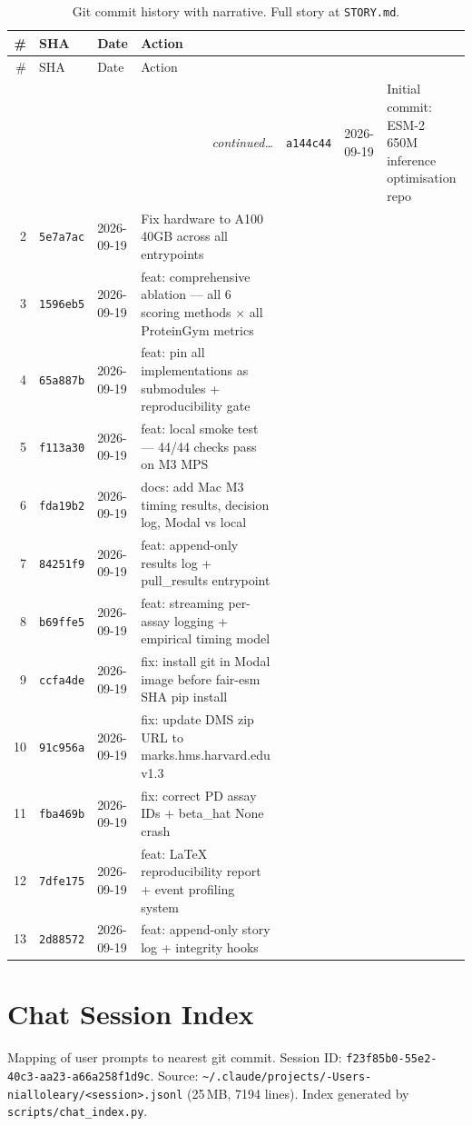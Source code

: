 \documentclass[11pt,a4paper]{article}
\begin{document}
\begin{longtable}{rp{2.2cm}p{3.2cm}p{6cm}}
\caption{Git commit history with narrative. Full story at \texttt{STORY.md}.}
\label{tab:story}\\
\toprule
\# & SHA & Date & Action \\
\midrule
\endfirsthead
\toprule
\# & SHA & Date & Action \\
\midrule
\endhead
\midrule\multicolumn{4}{r}{\small\itshape continued\ldots}
\endfoot
\bottomrule
\endlastfoot
 1 & \texttt{a144c44} & 2026-09-19 & Initial commit: ESM-2 650M inference optimisation repo \\
 2 & \texttt{5e7a7ac} & 2026-09-19 & Fix hardware to A100 40GB across all entrypoints \\
 3 & \texttt{1596eb5} & 2026-09-19 & feat: comprehensive ablation --- all 6 scoring methods $\times$ all ProteinGym metrics \\
 4 & \texttt{65a887b} & 2026-09-19 & feat: pin all implementations as submodules + reproducibility gate \\
 5 & \texttt{f113a30} & 2026-09-19 & feat: local smoke test --- 44/44 checks pass on M3 MPS \\
 6 & \texttt{fda19b2} & 2026-09-19 & docs: add Mac M3 timing results, decision log, Modal vs local \\
 7 & \texttt{84251f9} & 2026-09-19 & feat: append-only results log + pull\_results entrypoint \\
 8 & \texttt{b69ffe5} & 2026-09-19 & feat: streaming per-assay logging + empirical timing model \\
 9 & \texttt{ccfa4de} & 2026-09-19 & fix: install git in Modal image before fair-esm SHA pip install \\
10 & \texttt{91c956a} & 2026-09-19 & fix: update DMS zip URL to marks.hms.harvard.edu v1.3 \\
11 & \texttt{fba469b} & 2026-09-19 & fix: correct PD assay IDs + beta\_hat None crash \\
12 & \texttt{7dfe175} & 2026-09-19 & feat: LaTeX reproducibility report + event profiling system \\
13 & \texttt{2d88572} & 2026-09-19 & feat: append-only story log + integrity hooks \\
\end{longtable}

\section{Chat Session Index}
\label{app:chat}

Mapping of user prompts to nearest git commit.
Session ID: \texttt{f23f85b0-55e2-40c3-aa23-a66a258f1d9c}.
Source: \texttt{\textasciitilde/.claude/projects/-Users-nialloleary/<session>.jsonl} (25\,MB, 7194 lines).
Index generated by \texttt{scripts/chat\_index.py}.


\end{document}
